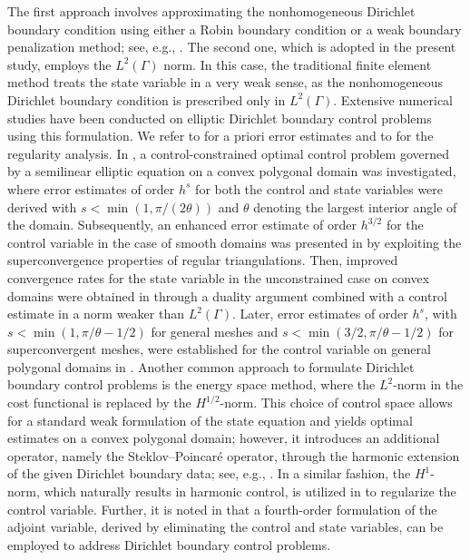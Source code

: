 \documentclass[a4paper,10pt]{article}
\numberwithin{theorem}{section}
\begin{document}
The first approach involves approximating the nonhomogeneous Dirichlet boundary condition using either a Robin boundary condition or a weak boundary penalization method; see, e.g., \cite{NArada_JPRaymond_2002a,FBBelgacem_HEFekih_HMetoui_2003}. The second one, which is adopted in the present study, employs the
$L^2(\Gamma)$  norm. In this case, the traditional finite element method treats the state variable in a very weak sense, as the nonhomogeneous Dirichlet boundary condition is prescribed only in  $L^2(\Gamma)$. Extensive numerical studies have been conducted on elliptic Dirichlet boundary control problems using this formulation. We refer to \cite{TApel_MMateos_JPfefferer_ARosch_2018,ECasas_JPRaymond_2006b,KDeckelnick_AGunther_MHinze_2009,SMay_RRannacher_BVexler_2013,MMateos_2018,JPfefferer_BVexler_2025} for a priori error estimates and to \cite{TApel_MMateos_JPfefferer_ARosch_2015} for the regularity analysis. In  \cite{ECasas_JPRaymond_2006b}, a control-constrained optimal control problem governed by a semilinear elliptic equation on a convex polygonal domain was investigated, where error estimates of order $h^s$ for both the control and state variables were derived with $s < \min(1, \pi/(2\theta))$ and $\theta$ denoting the largest interior angle of the domain. Subsequently, an enhanced error estimate of order $h^{3/2}$ for the control variable in the case of smooth domains  was presented in \cite{KDeckelnick_AGunther_MHinze_2009} by exploiting the superconvergence properties of regular triangulations. Then, improved convergence rates for the state variable in the unconstrained case on convex domains were obtained in \cite{SMay_RRannacher_BVexler_2013} through a duality argument combined with a control estimate in a norm weaker than $L^2(\Gamma)$. Later, error estimates of order $h^s$, with $s < \min(1, \pi/\theta - 1/2)$ for general meshes and $s < \min(3/2, \pi/\theta - 1/2)$ for superconvergent meshes, were established for the control variable on general polygonal domains in \cite{TApel_MMateos_JPfefferer_ARosch_2018}. Another common approach to formulate Dirichlet boundary control problems is the energy space method, where the $L^2$-norm in the cost functional is replaced by the $H^{1/2}$-norm. This choice of control space allows for a standard weak formulation of the state equation and yields optimal estimates on a convex polygonal domain; however, it introduces an additional operator, namely the Steklov–Poincaré operator, through the harmonic extension of the given Dirichlet boundary data; see, e.g., \cite{GOf_TXPhan_OSteinbach_2010,MWinkler_2020}. In a similar fashion, the $H^1$-norm, which naturally results in harmonic control, is utilized in \cite{SChowdhury_TGudi_AKNandakumaran_2017,MKarkulik_2020} to regularize the control variable. Further, it is noted in \cite{SDu_XHe_2023} that a fourth-order formulation of the adjoint variable, derived by eliminating the control and state variables, can be employed to address Dirichlet boundary control problems. 
\end{document}
